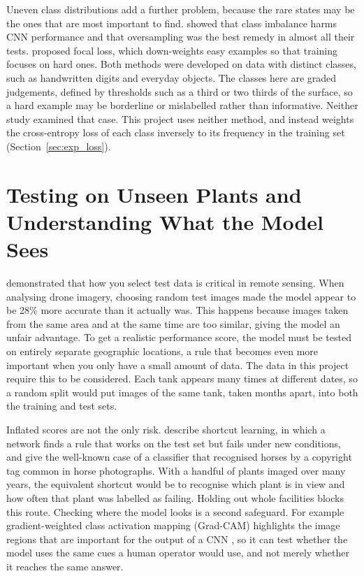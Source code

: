 Uneven class distributions add a further problem, because the rare states may be the ones that are most important to find. \citet{buda2018} showed that class imbalance harms CNN performance and that oversampling was the best remedy in almost all their tests. \citet{lin2017focal} proposed focal loss, which down-weights easy examples so that training focuses on hard ones. Both methods were developed on data with distinct classes, such as handwritten digits and everyday objects. The classes here are graded judgements, defined by thresholds such as a third or two thirds of the surface, so a hard example may be borderline or mislabelled rather than informative. Neither study examined that case. This project uses neither method, and instead weights the cross-entropy loss of each class inversely to its frequency in the training set (Section~\ref{sec:exp_loss}).

\section{Testing on Unseen Plants and Understanding What the Model Sees}
\label{sec:generalisation}

\citet{kattenborn2022} demonstrated that how you select test data is critical in remote sensing. When analysing drone imagery, choosing random test images made the model appear to be 28\% more accurate than it actually was. This happens because images taken from the same area and at the same time are too similar, giving the model an unfair advantage. To get a realistic performance score, the model must be tested on entirely separate geographic locations, a rule that becomes even more important when you only have a small amount of data. The data in this project require this to be considered. Each tank appears many times at different dates, so a random split would put images of the same tank, taken months apart, into both the training and test sets.

Inflated scores are not the only risk. \citet{geirhos2020} describe shortcut learning, in which a network finds a rule that works on the test set but fails under new conditions, and \citet{lapuschkin2019} give the well-known case of a classifier that recognised horses by a copyright tag common in horse photographs. With a handful of plants imaged over many years, the equivalent shortcut would be to recognise which plant is in view and how often that plant was labelled as failing. Holding out whole facilities blocks this route. Checking where the model looks is a second safeguard. For example gradient-weighted class activation mapping (Grad-CAM) highlights the image regions that are important for the output of a CNN \citep{selvaraju2017gradcam}, so it can test whether the model uses the same cues a human operator would use, and not merely whether it reaches the same answer.

